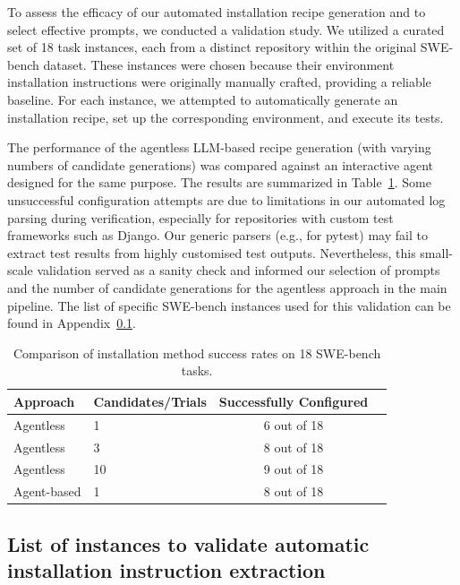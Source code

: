 \documentclass[dandb]{article}
\begin{document}
To assess the efficacy of our automated installation recipe generation and to select effective prompts, we conducted a validation study. We utilized a curated set of 18 task instances, each from a distinct repository within the original SWE-bench dataset. These instances were chosen because their environment installation instructions were originally manually crafted, providing a reliable baseline. For each instance, we attempted to automatically generate an installation recipe, set up the corresponding environment, and execute its tests.

The performance of the agentless LLM-based recipe generation (with varying numbers of candidate generations) was compared against an interactive agent designed for the same purpose. The results are summarized in Table~\ref{tab:install_method_comparison}. Some unsuccessful configuration attempts are due to limitations in our automated log parsing during verification, especially for repositories with custom test frameworks such as Django. Our generic parsers (e.g., for pytest) may fail to extract test results from highly customised test outputs. Nevertheless, this small-scale validation served as a sanity check and informed our selection of prompts and the number of candidate generations for the agentless approach in the main pipeline. The list of specific SWE-bench instances used for this validation can be found in Appendix~\ref{list_of_instances}.

\begin{table}[htbp]
  \centering
  \caption{Comparison of installation method success rates on 18 SWE-bench tasks.}
  \label{tab:install_method_comparison}
  \begin{tabular}{llcc}
    \toprule
    Approach & Candidates/Trials & Successfully Configured \\
    \midrule
    Agentless & 1 & 6 out of 18 \\
    Agentless & 3 & 8 out of 18 \\
    Agentless & 10 & 9 out of 18 \\
    Agent-based & 1 & 8 out of 18 \\
    \bottomrule
  \end{tabular}
\end{table}

\subsection{List of instances to validate automatic installation instruction extraction}
\label{list_of_instances}
\end{document}
